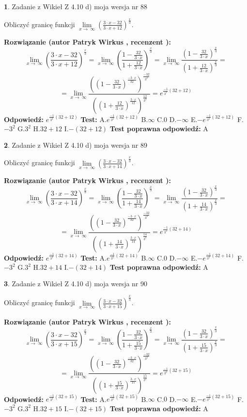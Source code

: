 \documentclass[12pt, a4paper]{article}
\theoremstyle{definition} %
\newtheorem{zad}{}
\newcommand{\zadStart}[1]{\begin{zad}#1\newline}
\newcommand{\zadStop}{\end{zad}}
\newcommand{\rozwStart}[2]{\noindent \textbf{Rozwiązanie (autor #1 , recenzent #2): }\newline}
\newcommand{\rozwStop}{\newline}
\newcommand{\odpStart}{\noindent \textbf{Odpowiedź:}\newline}
\newcommand{\odpStop}{\newline}
\newcommand{\testStart}{\noindent \textbf{Test:}\newline}
\newcommand{\testStop}{\newline}
\newcommand{\kluczStart}{\noindent \textbf{Test poprawna odpowiedź:}\newline}
\newcommand{\kluczStop}{\newline}
\begin{document}
\zadStart{Zadanie z Wikieł Z 4.10 d) moja wersja nr 88}


Obliczyć granicę funkcji  $\lim\limits_{x\to\ \infty}(\frac{3\cdot x-32}{3\cdot x+12})^{\frac{x}{3}}$.
\zadStop
\rozwStart{Patryk Wirkus}{}
$$\lim\limits_{x\to\ \infty}(\frac{3\cdot x-32}{3\cdot x+12})^{\frac{x}{3}} = \lim\limits_{x\to\ \infty}(\frac{1-\frac{32}{3\cdot x}}{1+\frac{12}{3\cdot x}})^{\frac{x}{3}}=\lim\limits_{x\to\ \infty}\frac{(1-\frac{32}{3\cdot x})^{\frac{x}{3}}}{(1+\frac{12}{3\cdot x})^{\frac{x}{3}}}=$$
$$=\lim\limits_{x\to\ \infty}\frac{((1-\frac{32}{3\cdot x})^{\frac{-3\cdot x}{32}})^{\frac{-32}{3^{2}}}}{((1+\frac{12}{3\cdot x})^{\frac{3\cdot x}{12}})^{\frac{12}{3^{2}}}}=e^{\frac{-1}{3^{2}}(32+12)}$$
\rozwStop
\odpStart
$e^{\frac{-1}{3^{2}}(32+12)}$
\odpStop
\testStart
A.$e^{\frac{-1}{3^{2}}(32+12)}$ B.$\infty$ C.$0$ D.$-\infty$ E.$-e^{\frac{-1}{3^{2}}(32+12)}$
F.$-3^{2}$ G.$3^{2}$
H.$32+12$
I.$-(32+12)$
\testStop
\kluczStart
A
\kluczStop



\zadStart{Zadanie z Wikieł Z 4.10 d) moja wersja nr 89}


Obliczyć granicę funkcji  $\lim\limits_{x\to\ \infty}(\frac{3\cdot x-32}{3\cdot x+14})^{\frac{x}{3}}$.
\zadStop
\rozwStart{Patryk Wirkus}{}
$$\lim\limits_{x\to\ \infty}(\frac{3\cdot x-32}{3\cdot x+14})^{\frac{x}{3}} = \lim\limits_{x\to\ \infty}(\frac{1-\frac{32}{3\cdot x}}{1+\frac{14}{3\cdot x}})^{\frac{x}{3}}=\lim\limits_{x\to\ \infty}\frac{(1-\frac{32}{3\cdot x})^{\frac{x}{3}}}{(1+\frac{14}{3\cdot x})^{\frac{x}{3}}}=$$
$$=\lim\limits_{x\to\ \infty}\frac{((1-\frac{32}{3\cdot x})^{\frac{-3\cdot x}{32}})^{\frac{-32}{3^{2}}}}{((1+\frac{14}{3\cdot x})^{\frac{3\cdot x}{14}})^{\frac{14}{3^{2}}}}=e^{\frac{-1}{3^{2}}(32+14)}$$
\rozwStop
\odpStart
$e^{\frac{-1}{3^{2}}(32+14)}$
\odpStop
\testStart
A.$e^{\frac{-1}{3^{2}}(32+14)}$ B.$\infty$ C.$0$ D.$-\infty$ E.$-e^{\frac{-1}{3^{2}}(32+14)}$
F.$-3^{2}$ G.$3^{2}$
H.$32+14$
I.$-(32+14)$
\testStop
\kluczStart
A
\kluczStop



\zadStart{Zadanie z Wikieł Z 4.10 d) moja wersja nr 90}


Obliczyć granicę funkcji  $\lim\limits_{x\to\ \infty}(\frac{3\cdot x-32}{3\cdot x+15})^{\frac{x}{3}}$.
\zadStop
\rozwStart{Patryk Wirkus}{}
$$\lim\limits_{x\to\ \infty}(\frac{3\cdot x-32}{3\cdot x+15})^{\frac{x}{3}} = \lim\limits_{x\to\ \infty}(\frac{1-\frac{32}{3\cdot x}}{1+\frac{15}{3\cdot x}})^{\frac{x}{3}}=\lim\limits_{x\to\ \infty}\frac{(1-\frac{32}{3\cdot x})^{\frac{x}{3}}}{(1+\frac{15}{3\cdot x})^{\frac{x}{3}}}=$$
$$=\lim\limits_{x\to\ \infty}\frac{((1-\frac{32}{3\cdot x})^{\frac{-3\cdot x}{32}})^{\frac{-32}{3^{2}}}}{((1+\frac{15}{3\cdot x})^{\frac{3\cdot x}{15}})^{\frac{15}{3^{2}}}}=e^{\frac{-1}{3^{2}}(32+15)}$$
\rozwStop
\odpStart
$e^{\frac{-1}{3^{2}}(32+15)}$
\odpStop
\testStart
A.$e^{\frac{-1}{3^{2}}(32+15)}$ B.$\infty$ C.$0$ D.$-\infty$ E.$-e^{\frac{-1}{3^{2}}(32+15)}$
F.$-3^{2}$ G.$3^{2}$
H.$32+15$
I.$-(32+15)$
\testStop
\kluczStart
A
\kluczStop
\end{document}
